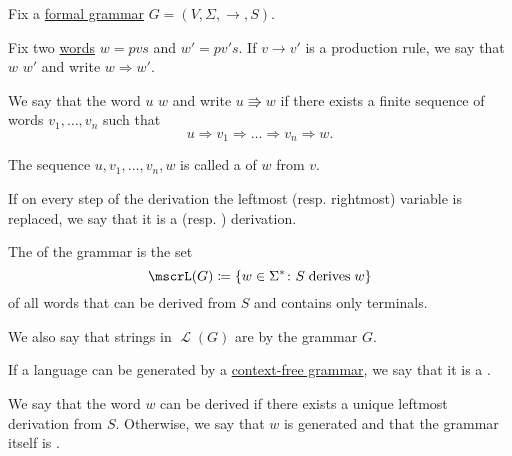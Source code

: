 \begin{definition}\label{def:grammar_derivation}
  Fix a \hyperref[def:grammar]{formal grammar} \( G = (V, \Sigma, \to, S) \).

  \begin{thmenum}
     Fix two \hyperref[def:language/word]{words} \( w = pvs \) and \( w' = pv's \). If \( v \to v' \) is a production rule, we say that \( w \)  \( w' \) and write \( w \Rightarrow w' \).

     We say that the word \( u \)  \( w \) and write \( u \Rrightarrow w \) if there exists a finite sequence of words \( v_1, \ldots, v_n \) such that
    \begin{equation*}
      u \Rightarrow v_1 \Rightarrow \ldots \Rightarrow v_n \Rightarrow w.
    \end{equation*}

    The sequence \( u, v_1, \ldots, v_n, w \) is called a  of \( w \) from \( v \).

     If on every step of the derivation the leftmost (resp. rightmost) variable is replaced, we say that it is a  (resp. ) derivation.

     The  of the grammar is the set
    \begin{equation*}
      \mscrL(G) \coloneqq \{ w \in \Sigma^* \colon S \T{derives} w \}
    \end{equation*}
    of all words that can be derived from \( S \) and contains only terminals.

    We also say that strings in \( \mscrL(G) \) are  by the grammar \( G \).

    If a language can be generated by a \hyperref[def:grammar/context_free]{context-free grammar}, we say that it is a .

    We say that the word \( w \) can be derived  if there exists a unique leftmost derivation from \( S \). Otherwise, we say that \( w \) is generated  and that the grammar itself is .
  \end{thmenum}
\end{definition}

